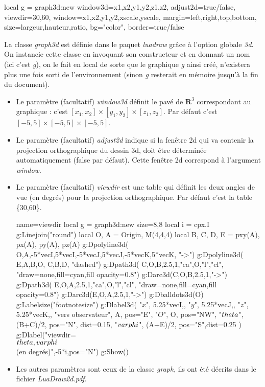\begin{Luacode}
local g = graph3d:new{ window3d={x1,x2,y1,y2,z1,z2}, adjust2d=true/false, viewdir={30,60}, window={x1,x2,y1,y2,xscale,yscale}, margin={left,right,top,bottom}, size={largeur,hauteur,ratio}, bg="color", border=true/false }
\end{Luacode}

La classe \emph{graph3d} est définie dans le paquet \emph{luadraw} grâce à l'option globale \emph{3d}. On instancie cette classe en invoquant son constructeur et en donnant un nom (ici c'est \emph{g}), on le fait en local de sorte que le graphique \emph{g} ainsi créé, n'existera plus une fois sorti de l'environnement (sinon \emph{g} resterait en mémoire jusqu'à la fin du document).

\begin{itemize}
 \item Le paramètre (facultatif) \emph{window3d} définit le pavé de $\mathbf R^3$ correspondant au graphique : c'est $[x_1,x_2]\times[y_1,y_2]\times[z_1,z_2]$. Par défaut c'est $[-5,5]\times[-5,5]\times[-5,5]$.
 \item Le paramètre (facultatif) \emph{adjust2d} indique si la fenêtre 2d qui va contenir la projection orthographique du dessin 3d, doit être déterminée automatiquement (false par défaut). Cette fenêtre 2d correspond à l'argument \emph{window}.
 
 \item Le paramètre (facultatif) \emph{viewdir} est une table qui définit les deux angles de vue (en degrés) pour la projection orthographique. Par défaut c'est la table \{30,60\}.
 
\begin{center}
\label{viewdir}
\begin{luadraw}{name=viewdir}
local g = graph3d:new{ size={8,8} }
local i = cpx.I
g:Linejoin("round")
local O, A = Origin, M(4,4,4)
local B, C, D, E = pxy(A), px(A), py(A), pz(A)
g:Dpolyline3d( {{O,A},{-5*vecI,5*vecI},{-5*vecJ,5*vecJ},{-5*vecK,5*vecK}}, "->")
g:Dpolyline3d( {{E,A,B,O}, {C,B,D}}, "dashed")
g:Dpath3d( {C,O,B,2.5,1,"ca",O,"l","cl"}, "draw=none,fill=cyan,fill opacity=0.8")
g:Darc3d(C,O,B,2.5,1,"->")
g:Dpath3d( {E,O,A,2.5,1,"ca",O,"l","cl"}, "draw=none,fill=cyan,fill opacity=0.8")
g:Darc3d(E,O,A,2.5,1,"->")
g:Dballdots3d(O)
g:Labelsize("footnotesize")
g:Dlabel3d(
    "$x$", 5.25*vecI,{}, "$y$", 5.25*vecJ,{}, "$z$", 5.25*vecK,{},
    "vers observateur", A, {pos="E"},
    "$O$", O, {pos="NW"},
    "$\\theta$", (B+C)/2, {pos="N", dist=0.15},
    "$\\varphi$", (A+E)/2, {pos="S",dist=0.25}
)
g:Dlabel("viewdir=\\{$\\theta,\\varphi$\\} (en degrés)",-5*i,{pos="N"})
g:Show()            
\end{luadraw}
\end{center}

\item Les autres paramètres sont ceux de la classe \emph{graph}, ils ont été décrits dans le fichier \emph{LuaDraw2d.pdf}.
\end{itemize}

